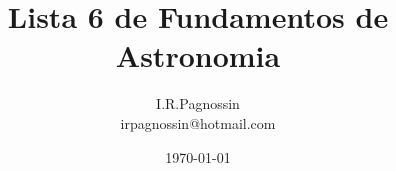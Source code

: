 \documentclass[a4paper,10pt]{article}
\begin{document}
\pagestyle{myheadings}
\renewcommand{\thefootnote}{\fnsymbol{footnote}}	

\title {Lista 6 de Fundamentos de Astronomia}  
\author {I.R.Pagnossin \\ irpagnossin@hotmail.com}
\date {\today}
\maketitle




\end{document}
